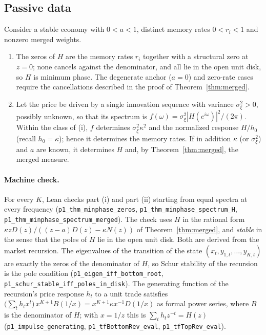 \subsection{Passive data}

\begin{theorem}\label{thm:minphase}
Consider a stable economy with $0<a<1$, distinct memory rates $0<r_i<1$ and nonzero merged weights.
\begin{enumerate}[label=(\roman*)]
\item The zeros of $H$ are the memory rates $r_i$ together with a structural zero at $z=0$; none cancels against the denominator, and all lie in the open unit disk, so $H$ is minimum phase. The degenerate anchor ($a=0$) and zero-rate cases require the cancellations described in the proof of Theorem~\ref{thm:merged}.
\item Let the price be driven by a single innovation sequence with variance $\sigma_\xi^2>0$, possibly unknown, so that its spectrum is $f(\omega)=\sigma_\xi^2|H(e^{i\omega})|^2/(2\pi)$. Within the class of (i), $f$ determines $\sigma_\xi^2\kappa^2$ and the normalized response $H/h_0$ (recall $h_0=\kappa$); hence it determines the memory rates. If in addition $\kappa$ (or $\sigma_\xi^2$) and $a$ are known, it determines $H$ and, by Theorem~\ref{thm:merged}, the merged measure.
\end{enumerate}
\end{theorem}

\paragraph{Machine check.} For every $K$, Lean checks part (i) and part (ii) starting from equal spectra at every frequency (\texttt{p1\_thm\_minphase\_zeros}, \texttt{p1\_thm\_minphase\_spectrum\_H}, \texttt{p1\_thm\_minphase\_spectrum\_merged}). The check uses $H$ in the rational form $\kappa zD(z)/((z-a)D(z)-\kappa N(z))$ of Theorem~\ref{thm:merged}, and \emph{stable} in the sense that the poles of $H$ lie in the open unit disk. Both are derived from the market recursion. The eigenvalues of the transition of the state $(x_t,y_{1,t},\ldots,y_{K,t})$ are exactly the zeros of the denominator of $H$, so Schur stability of the recursion is the pole condition (\texttt{p1\_eigen\_iff\_bottom\_root}, \texttt{p1\_schur\_stable\_iff\_poles\_in\_disk}). The generating function of the recursion's price response $h_t$ to a unit trade satisfies $\bigl(\sum_th_tx^t\bigr)\,x^{K+1}B(1/x)=x^{K+1}\kappa x^{-1}D(1/x)$ as formal power series, where $B$ is the denominator of $H$; with $x=1/z$ this is $\sum_th_tz^{-t}=H(z)$ (\texttt{p1\_impulse\_generating}, \texttt{p1\_tfBottomRev\_eval}, \texttt{p1\_tfTopRev\_eval}).

